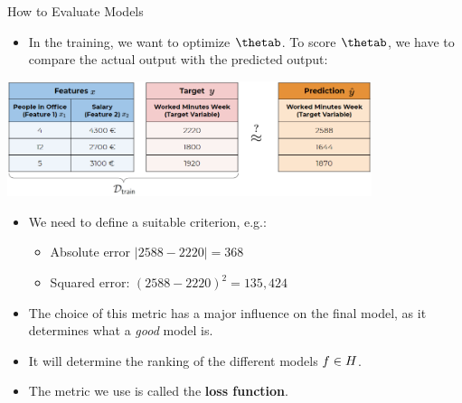 \documentclass[11pt,compress,t,notes=noshow, xcolor=table]{beamer}
\begin{document}
\begin{vbframe}{How to Evaluate Models}

\begin{itemize}
\item In the training, we want to optimize $\thetab$. To score $\thetab$, we have to compare the actual output with the predicted output: 
\end{itemize}





\begin{center}\includegraphics[width=0.8\textwidth]{figure_man/ml-basics-riskmin-eval.png} \end{center}
\vspace{-0.5cm}
\begin{itemize}
    \item We need to define a suitable criterion, e.g.:
    \begin{itemize}
      \item Absolute error $|2588 - 2220| = 368$
      \item Squared error: $(2588 - 2220)^2 = 135,424$\\
    \end{itemize}
    \item The choice of this metric has a major influence on the final model, as it determines what a \emph{good} model is. 
    \item It will determine the ranking of the different models $f \in H$.
    \item The metric we use is called the \textbf{loss function}. 
  \end{itemize}
  
\end{vbframe}
\end{document}
